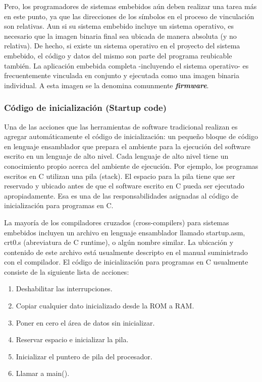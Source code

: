 \documentclass[output=paper, 
colorlinks,
citecolor=brown,
newtxmath
]{langscibook}
\begin{document}
Pero, los programadores de sistemas embebidos aún deben realizar una
tarea más en este punto, ya que 
las direcciones de los símbolos en el proceso de vinculación son relativas.
Aun si su sistema embebido incluye un sistema operativo, es necesario
que la imagen binaria final sea ubicada de manera absoluta (y no relativa).
De hecho, si existe un sistema operativo en el proyecto del sistema embebido,
el código y datos del mismo son parte del programa reubicable 
también.
La aplicación embebida completa -incluyendo el sistema operativo- es
frecuentemente vinculada en conjunto y ejecutada como una imagen binaria
individual. A esta imagen se la denomina comunmente \textit{\textbf{firmware}}.

\subsubsection {Código de inicialización (Startup code)}

Una de las acciones que las herramientas de software tradicional realizan
es agregar automáticamente el código de inicialización: un pequeño bloque
de código en lenguaje ensamblador que prepara el ambiente para la ejecución
del software escrito en un lenguaje de alto nivel. Cada lenguaje de alto
nivel tiene un conocimiento propio acerca del ambiente de ejecución.
Por ejemplo, los programas escritos en C utilizan una pila (stack). El espacio
para la pila tiene que ser reservado y ubicado antes de que el software escrito
en C pueda ser ejecutado apropiadamente. Esa es una de las responsabilidades
asignadas al código de inicialización para programas en C.

La mayoría de los compiladores cruzados (cross-compilers) para sistemas
embebidos incluyen un archivo en lenguaje ensamblador llamado startup.asm, crt0.s
(abreviatura de C runtime), o algún nombre similar. La ubicación y contenido de este
archivo está usualmente descripto en el manual suministrado con el 
compilador. El código de inicialización para programas en C usualmente 
consiste de la siguiente
lista de acciones:

\begin{enumerate}
\item Deshabilitar las interrupciones.
\item Copiar cualquier dato inicializado desde la ROM a RAM.
\item Poner en cero el área de datos sin inicializar.
\item Reservar espacio e inicializar la pila.
\item Inicializar el puntero de pila del procesador.
\item Llamar a main().
\end{enumerate}
\end{document}
